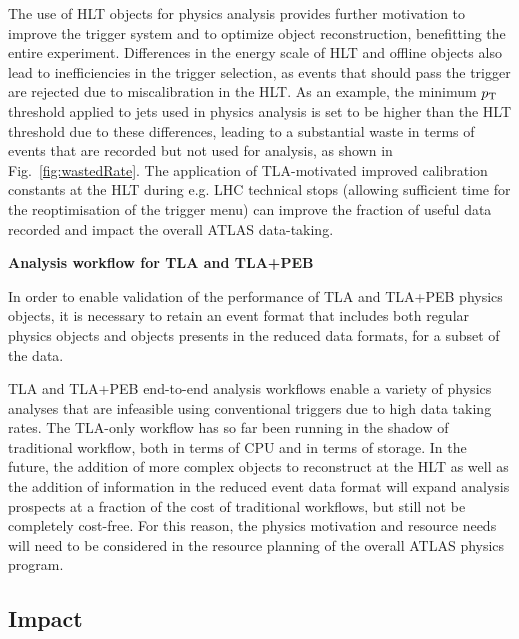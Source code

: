 The use of HLT objects for physics analysis provides further motivation to improve the trigger system and to optimize object reconstruction, benefitting the entire experiment.
Differences in the energy scale of HLT and offline objects also lead to inefficiencies in the trigger selection, as events that should pass the trigger are rejected due to miscalibration in the HLT. 
As an example, the minimum $p_{\rm{T}}$ threshold applied to jets used in physics analysis is set to be higher than the HLT threshold due to these differences, leading to a substantial waste in terms of events that are recorded but not used for analysis, as shown in Fig.~\ref{fig:wastedRate}. 
The application of TLA-motivated improved calibration constants at the HLT during e.g. LHC technical stops (allowing sufficient time for the reoptimisation of the trigger menu) can improve the fraction of useful data recorded and impact the overall ATLAS data-taking. 

\textbf{Analysis workflow for TLA and TLA+PEB}

In order to enable validation of the performance of TLA and TLA+PEB physics objects, it is necessary to retain an event format that includes both regular physics objects and objects presents in the reduced data formats, for a subset of the data.  

TLA and TLA+PEB end-to-end analysis workflows enable a variety of physics analyses that are infeasible using conventional triggers due to high data taking rates. The TLA-only workflow has so far been running in the shadow of traditional workflow, both in terms of CPU and in terms of storage. In the future, the addition of more complex objects to reconstruct at the HLT as well as the addition of information in the reduced event data format will expand analysis prospects at a fraction of the cost of traditional workflows, but still not be completely cost-free. For this reason, the physics motivation and resource needs will need to be considered in the resource planning of the overall ATLAS physics program.



\subsection{Impact}

